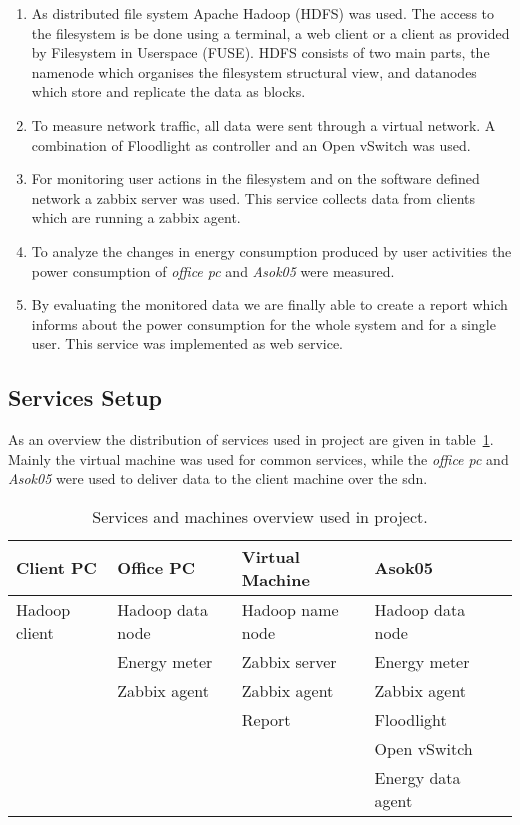 \begin{enumerate}

\item As distributed file system Apache Hadoop (HDFS) was used. The access to the filesystem is be done using a terminal, a web client or a client as provided by Filesystem in Userspace (FUSE). HDFS consists of two main parts, the namenode which organises the filesystem structural view, and datanodes which store and replicate the data as blocks.

\item To measure network traffic, all data were sent through a virtual network. A combination of Floodlight as controller and an Open vSwitch was used. 

\item For monitoring user actions in the filesystem and on the software defined network a zabbix server was used. This service collects data from clients which are running a zabbix agent.

\item To analyze the changes in energy consumption produced by user activities the power consumption of \textit{office pc} and \textit{Asok05} were measured.

\item By evaluating the monitored data we are finally able to create a  report which informs about the power consumption for the whole system and for a single user. This service was implemented as web service.

\end{enumerate}

\subsection{Services Setup}

As an overview the distribution of services used in project are given in table~\ref{tab:services}. Mainly the virtual machine was used for common services, while the \textit{office pc} and \textit{Asok05} were used to deliver data to the client machine over the sdn.

\begin{table}[b]
	\centering
	\caption{Services and machines overview used in project. }
	\begin{tabular}{|l|l|l|l|l|}
		\hline \rule[-2ex]{0pt}{5.5ex} \textbf{Client PC} & \textbf{Office PC} & \textbf{Virtual Machine} & \textbf{Asok05} \\ 
		\hline \rule[-2ex]{0pt}{5.5ex} Hadoop client & Hadoop data node & Hadoop name node & Hadoop data node \\ 
		       \rule[-2ex]{0pt}{5.5ex}  & Energy meter & Zabbix server & Energy meter \\ 
		       \rule[-2ex]{0pt}{5.5ex}  & Zabbix agent & Zabbix agent & Zabbix agent \\ 
		       \rule[-2ex]{0pt}{5.5ex}  &  & Report & Floodlight \\ 
		       \rule[-2ex]{0pt}{5.5ex}  &  &  & Open vSwitch \\ 
		       \rule[-2ex]{0pt}{5.5ex}  &  &  & Energy data agent \\ 
		\hline 
	\end{tabular}
	\label{tab:services}
\end{table}
